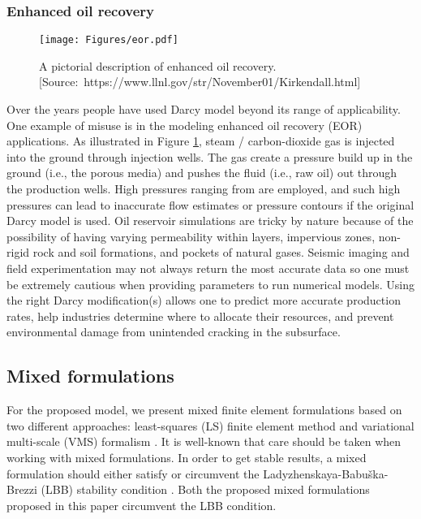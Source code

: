\documentclass[11pt,reqno]{amsart}
\begin{document}
\subsubsection{Enhanced oil recovery}
\begin{figure}[h]
  \centering
  \texttt{[image: Figures/eor.pdf]}
  \caption{A pictorial description of enhanced oil recovery. 
  [Source:~https://www.llnl.gov/str/November01/Kirkendall.html]}
  \label{fig:Intro_eor}
\end{figure}
Over the years people have used Darcy model beyond its 
range of applicability. One example of misuse is in the 
modeling enhanced oil recovery (EOR) applications. As 
illustrated in Figure \ref{fig:Intro_eor}, steam / 
carbon-dioxide gas is injected into the ground through 
injection wells. The 
gas create a pressure build up in the ground (i.e., the 
porous media) and pushes the fluid (i.e., raw oil) out 
through the production wells. High pressures ranging from 
 are employed, and such high 
pressures can lead to inaccurate flow estimates or 
pressure contours if the original Darcy model is used. 
Oil reservoir simulations are tricky by nature because 
of the possibility of having varying permeability within 
layers, impervious zones, non-rigid rock and soil 
formations, and pockets of natural gases. Seismic 
imaging and field experimentation may not always 
return the most accurate data so one must be extremely 
cautious when providing parameters to run numerical 
models. Using the right Darcy modification(s) allows 
one to predict more accurate production rates, help 
industries determine where to allocate their resources, 
and prevent environmental damage from unintended 
cracking in the subsurface.

\subsection{Mixed formulations}
For the proposed model, we present mixed finite element 
formulations based on two different approaches: least-squares 
(LS) finite element method \cite{Jiang_LSFEM} and variational 
multi-scale (VMS) formalism \cite{Hughes_CMAME_1995_v127_p387}. 
It is well-known that care should be taken when working 
with mixed formulations. In order to get stable results, 
a mixed formulation should either satisfy or circumvent 
the Ladyzhenskaya-Babu\v ska-Brezzi (LBB) stability 
condition \cite{Brezzi_Fortin}. Both the proposed 
mixed formulations proposed in this paper circumvent 
the LBB condition. 
\end{document}
